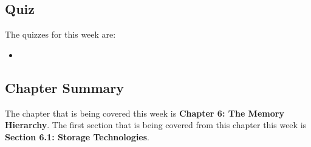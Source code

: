 \subsection{Quiz}

The quizzes for this week are:

\begin{itemize}
    \item {} \textbullet {} 
\end{itemize}

\subsection{Chapter Summary}

The chapter that is being covered this week is \textbf{Chapter 6: The Memory Hierarchy}. The first section that is being covered from this chapter this week is \textbf{Section 6.1: Storage Technologies}.

